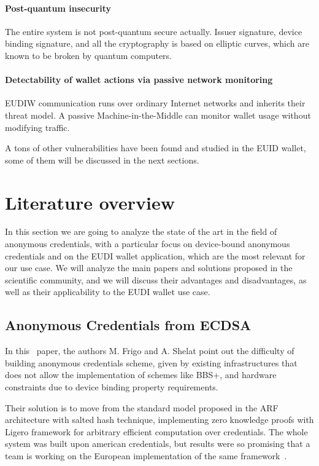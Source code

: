 \documentclass{article}
\begin{document}
\paragraph{Post-quantum insecurity}
The entire system is not post-quantum secure actually. Issuer signature, device
binding signature, and all the cryptography is based on elliptic curves, 
which are known to be broken by quantum computers.

\paragraph{Detectability of wallet actions via passive network monitoring}
EUDIW communication runs over ordinary Internet networks and inherits their
threat model. A passive Machine-in-the-Middle can monitor wallet usage
without modifying traffic.\newline

A tons of other vulnerabilities have been found and studied in the
EUID wallet, some of them will be discussed in the next sections.

\section{Literature overview}
\label{stateoftheart}
In this section we are going to analyze the state of the art in the field of anonymous credentials,
with a particular focus on device-bound anonymous credentials and on the EUDI wallet application,
which are the most relevant for our use case. We will analyze the main papers and solutions proposed 
in the scientific community, and we will discuss their advantages and disadvantages, as well as their 
applicability to the EUDI wallet use case.

\subsection{Anonymous Credentials from ECDSA}
\label{ecdsaanonymouscredentials}
In this~\cite{cryptoeprint:2024/2010} paper, the authors M. Frigo and A. Shelat point out the difficulty
of building anonymous credentials scheme, given by existing infrastructures that does not allow the 
implementation of schemes like BBS+, and hardware constraints due to device binding property requirements.

Their solution is to move from the standard model proposed in the ARF architecture with salted hash technique,
implementing zero knowledge proofs with Ligero framework for arbitrary efficient computation over credentials.
The whole system was built upon american credentials, but results were so promising that a team
is working on the European implementation of the same framework~\cite{longfellow-eu}.
\end{document}
